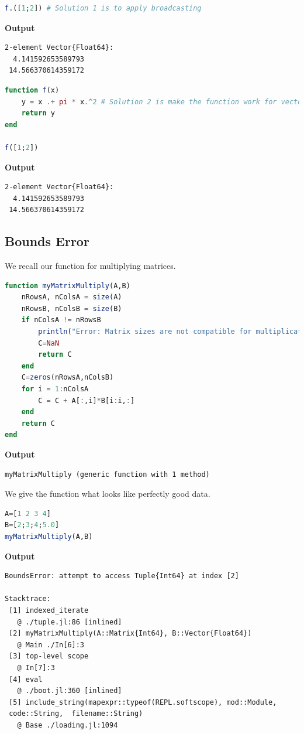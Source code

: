 \begin{lstlisting}[language=Julia,style=mystyle]
f.([1;2]) # Solution 1 is to apply broadcasting
\end{lstlisting}
\textbf{Output} 
\begin{verbatim}
2-element Vector{Float64}:
  4.141592653589793
 14.566370614359172
\end{verbatim}

\begin{lstlisting}[language=Julia,style=mystyle]
function f(x)
    y = x .+ pi * x.^2 # Solution 2 is make the function work for vectors or scalars
    return y
end

f([1;2])
\end{lstlisting}
\textbf{Output} 
\begin{verbatim}
2-element Vector{Float64}:
  4.141592653589793
 14.566370614359172
\end{verbatim}

\subsection{Bounds Error}

We recall our function for multiplying matrices.

\begin{lstlisting}[language=Julia,style=mystyle]
function myMatrixMultiply(A,B)
    nRowsA, nColsA = size(A)
    nRowsB, nColsB = size(B)
    if nColsA != nRowsB
        println("Error: Matrix sizes are not compatible for multiplication")
        C=NaN
        return C
    end
    C=zeros(nRowsA,nColsB)
    for i = 1:nColsA
        C = C + A[:,i]*B[i:i,:]
    end
    return C
end

\end{lstlisting}
\textbf{Output} 
\begin{verbatim}
myMatrixMultiply (generic function with 1 method)
\end{verbatim}

We give the function what looks like perfectly good data.

\begin{lstlisting}[language=Julia,style=mystyle]
A=[1 2 3 4]
B=[2;3;4;5.0]
myMatrixMultiply(A,B)
\end{lstlisting}
\textbf{Output} 
\begin{verbatim}
BoundsError: attempt to access Tuple{Int64} at index [2]

Stacktrace:
 [1] indexed_iterate
   @ ./tuple.jl:86 [inlined]
 [2] myMatrixMultiply(A::Matrix{Int64}, B::Vector{Float64})
   @ Main ./In[6]:3
 [3] top-level scope
   @ In[7]:3
 [4] eval
   @ ./boot.jl:360 [inlined]
 [5] include_string(mapexpr::typeof(REPL.softscope), mod::Module, 
 code::String,  filename::String)
   @ Base ./loading.jl:1094
\end{verbatim}

